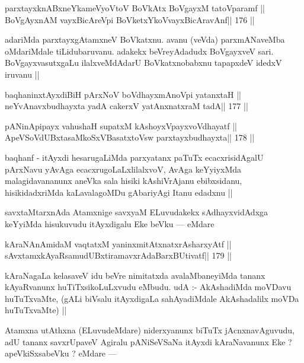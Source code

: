 \begin{shl}
parxtayxknABxneYkameVyoV\s toV BoVkAtx BoVgayxM tatoV\s paramf ||
BoVgAyxnAM vayxBicAreV\s pi BoVketxYkoV\s vayxBicAravAnf\hfill || 176 ||
\end{shl}

\begin{artha}
adariMda parxtayxgAtamxneV BoVkatxnu. avanu (veVda) parxmANaveMba 
oMdariMdale tiLidubaruvanu. adakekx beVreyAdadudx BoVgayxveV sari. BoVgayxvasutxgaLu ilalxveMdAdarU BoVkatxnobabxnu tapapxdeV idedxV iruvanu ||
\end{artha}

\begin{shl}
baqhaninxtAyxdiBiH pArxNoV boVdhayxmAnoV\s pi yatanxtaH ||
neYvAnavxbudhayxta yadA cakerxV yatAnxnatxraM tadA\hfill || 177 ||
\end{shl}

\begin{shl}
pANinA\s\s pipayx vahushaH supatxM kAshoyxV\s payxvoVdhayatf ||
ApeVSoVdUBxtasaMkoSxVBasatxtoV\s sw parxtayxbudhayxta\hfill || 178 ||
\end{shl}

\begin{artha}
baqhanf - itAyxdi hesarugaLiMda parxyatanx paTuTx ecacxrisidAgalU pArxNavu yAvAga ecacxrugoLaLxlilalxvoV, AvAga keYyiyxMda malagidavananunx aneVka sala hisiki kAshiVrAjanu ebibxsidanu, hisikidadxriMda kaLavalagoMDu gAbariyAgi Itanu edadxnu ||
\end{artha}

\begin{artha}
savxtaMtarxnAda Atamxnige savxyaM ELuvudakekx sAdhayxvidAdxga keYyiMda hisukuvudu itAyxdigalu Eke beVku --- eMdare 
\end{artha}

\begin{shl}
kAraNAnAmidaM vaqtatxM yaninxmitAtxnatxrAsharxyAtf ||
sAvxtamxkAyaRsamudUBxtiramavxrAdaBarxBUtivatf\hfill || 179 ||
\end{shl}

\begin{artha}
kAraNagaLa kelasaveV idu beVre nimitatxda avalaMbaneyiMda tananx kAyaRvanunx huTiTxsikoLuLxvudu eMbudu. udA :- AkAshadiMda moVDavu huTuTxvaMte, (gALi biVsalu itAyxdigaLa sahAyadiMdale AkAshadalilx moVDa huTuTxvaMte) ||
\end{artha}

\begin{artha}
Atamxna utAthxna (ELuvudeMdare) niderxyanunx biTuTx jAcnxnavAguvudu, adU tananx savxrUpaveV Agiralu pANiSeVSaNa itAyxdi kAraNavanunx Eke ? apeVkiSxsabeVku ? eMdare ---
\end{artha}

